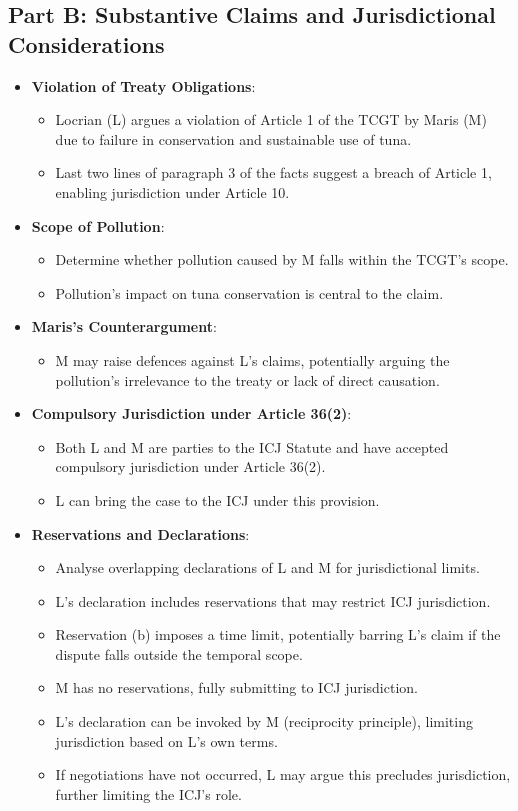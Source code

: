 \subsection{Part B: Substantive Claims and Jurisdictional Considerations}
\begin{itemize}
    \item \textbf{Violation of Treaty Obligations}:
    \begin{itemize}
        \item Locrian (L) argues a violation of Article 1 of the TCGT by Maris (M) due to failure in conservation and sustainable use of tuna.
        \item Last two lines of paragraph 3 of the facts suggest a breach of Article 1, enabling jurisdiction under Article 10.
    \end{itemize}
    \item \textbf{Scope of Pollution}:
    \begin{itemize}
        \item Determine whether pollution caused by M falls within the TCGT's scope.
        \item Pollution's impact on tuna conservation is central to the claim.
    \end{itemize}
    \item \textbf{Maris's Counterargument}:
    \begin{itemize}
        \item M may raise defences against L's claims, potentially arguing the pollution's irrelevance to the treaty or lack of direct causation.
    \end{itemize}
    \item \textbf{Compulsory Jurisdiction under Article 36(2)}:
    \begin{itemize}
        \item Both L and M are parties to the ICJ Statute and have accepted compulsory jurisdiction under Article 36(2).
        \item L can bring the case to the ICJ under this provision.
    \end{itemize}
    \item \textbf{Reservations and Declarations}:
    \begin{itemize}
        \item Analyse overlapping declarations of L and M for jurisdictional limits.
        \item L's declaration includes reservations that may restrict ICJ jurisdiction.
        \item Reservation (b) imposes a time limit, potentially barring L's claim if the dispute falls outside the temporal scope.
        \item M has no reservations, fully submitting to ICJ jurisdiction.
        \item L's declaration can be invoked by M (reciprocity principle), limiting jurisdiction based on L's own terms.
        \item If negotiations have not occurred, L may argue this precludes jurisdiction, further limiting the ICJ's role.
    \end{itemize}
\end{itemize}

